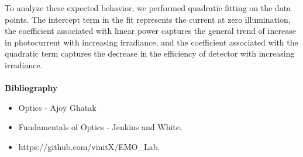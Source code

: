 \documentclass[12pt]{report}
\begin{document}
$$To analyze these expected behavior, we performed quadratic fitting on the data points. The intercept term in the fit represents the current at zero illumination, the coefficient associated with linear power captures the general trend of increase in photocurrent with increasing irradiance, and the coefficient associated with the quadratic term captures the decrease in the efficiency of detector with increasing irradiance.\\\\
\newpage
\Large{\textbf{Bibliography}}
\begin{itemize}
	\item Optics - Ajoy Ghatak
	\item Fundamentals of Optics - Jenkins and White.
	\item https://github.com/vinitX/EMO\_Lab.
\end{itemize}
 
\end{document}
